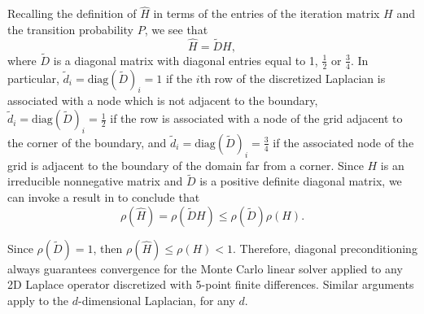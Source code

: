 \documentclass[final,leqno,onefignum,onetabnum]{siamltex1213}
\begin{document}
Recalling the definition of $\hat{H}$ in terms of the entries of the
iteration matrix $H$ and the transition probability $P$, we see that
\[
 \hat{H}=\tilde{D}H,
\]
where $\tilde{D}$ is a diagonal matrix with diagonal entries equal to
1, $\frac{1}{2}$ or $\frac{3}{4}$.
In particular, $\tilde{d}_i=\text{diag}(\tilde D)_i=1$ if the $i$th row of the
discretized Laplacian is associated with a node which is not adjacent to the
boundary, $\tilde{d}_i=\text{diag}(\tilde D)_i=\frac{1}{2}$ if the row is associated
with a node of the grid adjacent to the corner of the boundary,
and $\tilde{d}_i=\text{diag}(\tilde D)_i=\frac{3}{4}$ if the associated node of the grid
is adjacent to the boundary of the domain far from a corner.
Since $H$ is an irreducible nonnegative matrix and $\tilde{D}$ is a
positive definite diagonal matrix, we can invoke a result in
\cite{FK1975} to conclude that
\[
 \rho(\hat{H})=\rho(\tilde{D}H)\le \rho(\tilde D)\rho(H).
\]

Since $\rho(\tilde{D})=1$, then $\rho(\hat{H})\le \rho(H)<1$.
Therefore, diagonal preconditioning always guarantees convergence
for the Monte Carlo linear solver applied to any 2D Laplace
operator discretized with 5-point finite differences.
Similar arguments apply to the $d$-dimensional Laplacian, for any $d$.
\end{document}
